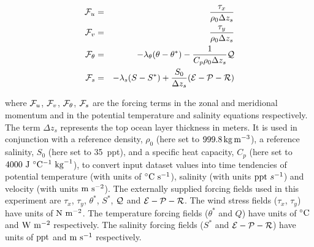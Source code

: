 \begin{eqnarray}
\label{EQ:global_forcing}
\label{EQ:global_forcing_fu}
{\cal F}_{u} & = & \frac{\tau_{x}}{\rho_{0} \Delta z_{s}}
\\
\label{EQ:global_forcing_fv}
{\cal F}_{v} & = & \frac{\tau_{y}}{\rho_{0} \Delta z_{s}}
\\
\label{EQ:global_forcing_ft}
{\cal F}_{\theta} & = & - \lambda_{\theta} ( \theta - \theta^{\ast} ) 
 - \frac{1}{C_{p} \rho_{0} \Delta z_{s}}{\cal Q}
\\
\label{EQ:global_forcing_fs}
{\cal F}_{s} & = & - \lambda_{s} ( S - S^{\ast} ) 
 + \frac{S_{0}}{\Delta z_{s}}({\cal E} - {\cal P} - {\cal R})
\end{eqnarray}

\noindent where ${\cal F}_{u}$, ${\cal F}_{v}$, ${\cal F}_{\theta}$,
${\cal F}_{s}$ are the forcing terms in the zonal and meridional
momentum and in the potential temperature and salinity
equations respectively.
The term $\Delta z_{s}$ represents the top ocean layer thickness in
meters.
It is used in conjunction with a reference density, $\rho_{0}$
(here set to $999.8\,{\rm kg\,m^{-3}}$), a
reference salinity, $S_{0}$ (here set to 35~ppt),
and a specific heat capacity, $C_{p}$ (here set to
$4000~{\rm J}~^{\circ}{\rm C}^{-1}~{\rm kg}^{-1}$), to convert
input dataset values into time tendencies of
potential temperature (with units of $^{\circ}{\rm C}~{\rm s}^{-1}$),
salinity (with units ${\rm ppt}~s^{-1}$) and
velocity (with units ${\rm m}~{\rm s}^{-2}$).
The externally supplied forcing fields used in this
experiment are $\tau_{x}$, $\tau_{y}$, $\theta^{\ast}$, $S^{\ast}$,
$\cal{Q}$ and $\cal{E}-\cal{P}-\cal{R}$. The wind stress fields ($\tau_x$, $\tau_y$)
have units of ${\rm N}~{\rm m}^{-2}$. The temperature forcing fields
($\theta^{\ast}$ and $Q$) have units of $^{\circ}{\rm C}$ and ${\rm W}~{\rm m}^{-2}$
respectively. The salinity forcing fields ($S^{\ast}$ and 
$\cal{E}-\cal{P}-\cal{R}$) have units of ${\rm ppt}$ and ${\rm m}~{\rm s}^{-1}$
respectively.
\\


